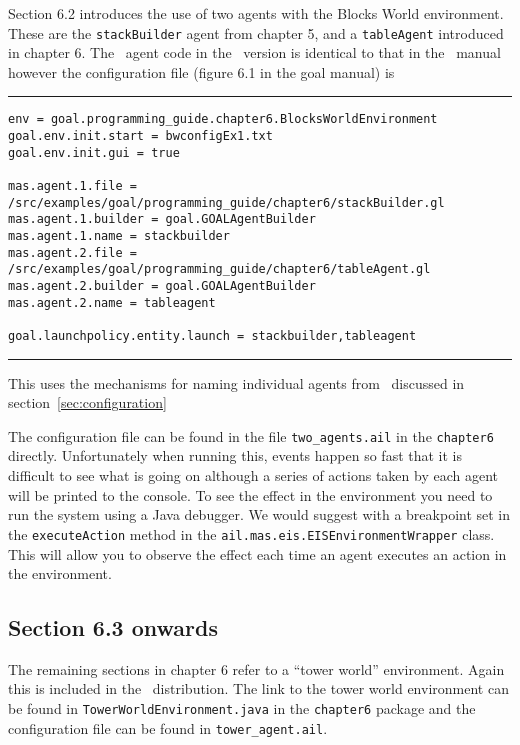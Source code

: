 Section 6.2 introduces the use of two agents with the Blocks World environment.  These are the \texttt{stackBuilder} agent from chapter 5, and a \texttt{tableAgent} introduced in chapter 6.  The \goal\ agent code in the \ail\ version is identical to that in the \goal\ manual however the configuration file (figure 6.1 in the goal manual) is

\noindent\rule{\textwidth}{1pt}
\begin{small}
\begin{verbatim}
env = goal.programming_guide.chapter6.BlocksWorldEnvironment
goal.env.init.start = bwconfigEx1.txt
goal.env.init.gui = true

mas.agent.1.file = /src/examples/goal/programming_guide/chapter6/stackBuilder.gl
mas.agent.1.builder = goal.GOALAgentBuilder
mas.agent.1.name = stackbuilder
mas.agent.2.file = /src/examples/goal/programming_guide/chapter6/tableAgent.gl
mas.agent.2.builder = goal.GOALAgentBuilder
mas.agent.2.name = tableagent

goal.launchpolicy.entity.launch = stackbuilder,tableagent
\end{verbatim}
\end{small}
\rule{\textwidth}{1pt}

This uses the mechanisms for naming individual agents from \ail\ discussed in section~\ref{sec:configuration}

\begin{sloppypar}
  The configuration file can be found in the file \texttt{two\_agents.ail} in the \texttt{chapter6} directly.  Unfortunately when running this, events happen so fast that it is difficult to see what is going on although a series of actions taken by each agent will be printed to the console.  To see the effect in the environment you need to run the system using a Java debugger.  We would suggest with a breakpoint set in the \texttt{executeAction} method in the \texttt{ail.mas.eis.EISEnvironmentWrapper} class.  This will allow you to observe the effect each time an agent executes an action in the environment.
  \end{sloppypar}

\subsection{Section 6.3 onwards}

The remaining sections in chapter 6 refer to a ``tower world'' environment.  Again this is included in the \ail\ distribution.  The link to the tower world environment can be found in \texttt{TowerWorldEnvironment.java} in the \texttt{chapter6} package and the configuration file can be found in \texttt{tower\_agent.ail}.

